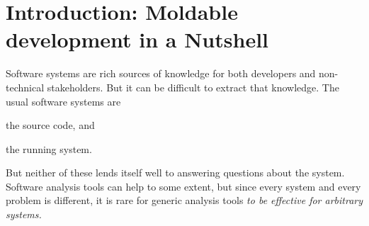 \documentclass[sigconf]{acmart}
\renewcommand{\nbc}[3]{} %
\newcommand\rb[1]{\nbc{Ralf}{#1}{teal}}
\newcommand\eog[1]{\nbc{Edward}{#1}{purple}}
\begin{document}

\maketitle

\section{Introduction: Moldable development in a Nutshell}


Software systems are rich sources of knowledge for both developers and non-technical stakeholders.
But it can be difficult to extract that knowledge.
The usual  software systems are
\begin{inparaenum}[(i)]
\item the source code, and
\item the running system.
\end{inparaenum}
But neither of these lends itself well to answering questions about the system.
Software analysis tools can help to some extent, but since every system and every problem is different, it is rare for generic analysis tools \emph{to be effective for arbitrary systems.}


\end{document}
